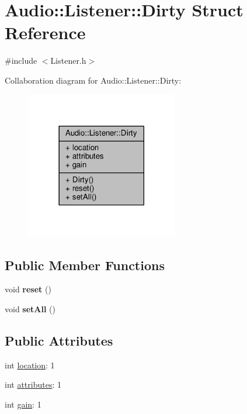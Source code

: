 \hypertarget{structAudio_1_1Listener_1_1Dirty}{}\section{Audio\+:\+:Listener\+:\+:Dirty Struct Reference}
\label{structAudio_1_1Listener_1_1Dirty}


{\ttfamily \#include $<$Listener.\+h$>$}



Collaboration diagram for Audio\+:\+:Listener\+:\+:Dirty\+:
\nopagebreak
\begin{figure}[H]
\begin{center}
\leavevmode
\includegraphics[width=189pt]{d8/d12/structAudio_1_1Listener_1_1Dirty__coll__graph}
\end{center}
\end{figure}
\subsection*{Public Member Functions}
\begin{DoxyCompactItemize}
\item 
void {\bfseries reset} ()\hypertarget{structAudio_1_1Listener_1_1Dirty_aa17dbd542d298427c4dd05dcd7ddef88}{}\label{structAudio_1_1Listener_1_1Dirty_aa17dbd542d298427c4dd05dcd7ddef88}

\item 
void {\bfseries set\+All} ()\hypertarget{structAudio_1_1Listener_1_1Dirty_a3065f418e8b0ca6a8fb0c07088a3612e}{}\label{structAudio_1_1Listener_1_1Dirty_a3065f418e8b0ca6a8fb0c07088a3612e}

\end{DoxyCompactItemize}
\subsection*{Public Attributes}
\begin{DoxyCompactItemize}
\item 
int \hyperlink{structAudio_1_1Listener_1_1Dirty_a5d78bd7ab799bee823262ca6daa0d4b6}{location}\+: 1
\item 
int \hyperlink{structAudio_1_1Listener_1_1Dirty_a1ad61f5193e118670c13eeaddb7de153}{attributes}\+: 1
\item 
int \hyperlink{structAudio_1_1Listener_1_1Dirty_a86c739a3691ef1610babb65c7963a234}{gain}\+: 1
\end{DoxyCompactItemize}


